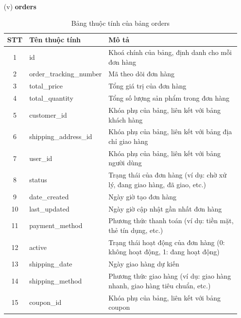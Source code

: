 \documentclass[../DoAn.tex]{subfiles}
\begin{document}
\begin{enumerate}
    \item[(v)] \textbf{orders}
    \begin{table}[H]
    \centering
        \begin{tabular}{|c|m{4cm}|m{8cm}|}
        \hline
        \textbf{STT} & \textbf{Tên thuộc tính} & \textbf{Mô tả} \\
        \hline
        1 & id & Khoá chính của bảng, định danh cho mỗi đơn hàng \\
        \hline
        2 & order\_tracking\_number & Mã theo dõi đơn hàng \\
        \hline
        3 & total\_price & Tổng giá trị của đơn hàng \\
        \hline
        4 & total\_quantity & Tổng số lượng sản phẩm trong đơn hàng \\
        \hline
        5 & customer\_id & Khóa phụ của bảng, liên kết với bảng khách hàng \\
        \hline
        6 & shipping\_address\_id & Khóa phụ của bảng, liên kết với bảng địa chỉ giao hàng \\
        \hline
        7 & user\_id & Khóa phụ của bảng, liên kết với bảng người dùng \\
        \hline
        8 & status & Trạng thái của đơn hàng (ví dụ: chờ xử lý, đang giao hàng, đã giao, etc.) \\
        \hline
        9 & date\_created & Ngày giờ tạo đơn hàng \\
        \hline
        10 & last\_updated & Ngày giờ cập nhật gần nhất đơn hàng \\
        \hline
        11 & payment\_method & Phương thức thanh toán (ví dụ: tiền mặt, thẻ tín dụng, etc.) \\
        \hline
        12 & active & Trạng thái hoạt động của đơn hàng (0: không hoạt động, 1: đang hoạt động) \\
        \hline
        13 & shipping\_date & Ngày giao hàng dự kiến \\
        \hline
        14 & shipping\_method & Phương thức giao hàng (ví dụ: giao hàng nhanh, giao hàng tiêu chuẩn, etc.) \\
        \hline
        15 & coupon\_id & Khóa phụ của bảng, liên kết với bảng coupon \\
        \hline
        \end{tabular}
        \caption{Bảng thuộc tính của bảng orders}
        \label{tab:orders_attributes}
    \end{table}


\end{enumerate}
\end{document}
